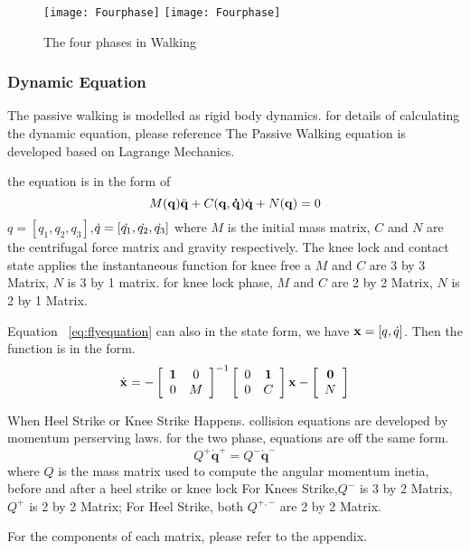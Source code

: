 \begin{figure}[!htbp]
  \begin{center}
    \leavevmode
    \ifpdf
      \texttt{[image: Fourphase]}
    \else
      \texttt{[image: Fourphase]}
    \fi
    \caption{The four phases in Walking}
    \label{fig:fwalkingphase}
\end{center}
\end{figure}

\subsubsection*{Dynamic Equation}

The passive walking is modelled as rigid body dynamics.
for details of calculating the dynamic equation, please reference\citep{Chen2007}
The Passive Walking equation is developed based on Lagrange Mechanics.


\begin{itemize}
the equation is in the form of 
\begin{equation}
\label{eq:flyequation}
M(\mathbf{q}) \ddot{\mathbf{q}} + C(\mathbf{q,\dot{q}})\dot{\mathbf{q}} + N(\mathbf{q}) = 0
\end{equation}
$q=[q_1,q_2,q_3]$,$\dot{q}=[\dot{q_1},\dot{q_2},\dot{q_3}]$
where $M$ is the initial mass matrix, $C$ and $N$ are the centrifugal force matrix and gravity respectively. The knee lock and contact state applies the instantaneous function
for knee free a  $M$ and $C$ are 3 by 3 Matrix, $N$ is 3 by 1 matrix.
for knee lock phase, $M$ and $C$ are 2 by 2 Matrix, $N$ is 2 by 1 Matrix.


Equation ~\ref{eq:flyequation} can also in the state form, we have $\mathbf{x}=[q,\dot{q}]$.
Then the function is in the form.
\begin{equation}
\dot{\mathbf{x}}=
-\left[ 
\begin{array}{cc}
\mathbf{1} &0\\
0 &M 
\end{array}
\right]^{-1}
\left[ 
\begin{array}{cc}
0 &\mathbf{1}\\
0 &C 
\end{array}
\right]\mathbf{x}
-\left[ 
\begin{array}{c}
\mathbf{0}\\
 N 
\end{array}
\right]
\end{equation}

When Heel Strike or Knee Strike Happens.
collision equations are developed by momentum perserving laws.
for the two phase, equations are off the same form.
\begin{equation}
Q^{+}\dot{\mathbf{q}}^{+} = Q^{-}\dot{\mathbf{q}}^{-}
\end{equation}
where $Q$ is the mass matrix used to compute the angular momentum inetia, before and after a heel strike or knee lock
For Knees Strike,$Q^-$ is 3 by 2 Matrix, $Q^+$ is 2 by 2 Matrix;
For Heel Strike, both $Q^{+,-}$ are 2 by 2 Matrix.
\end{itemize}
For the components of each matrix, please refer to the appendix.




